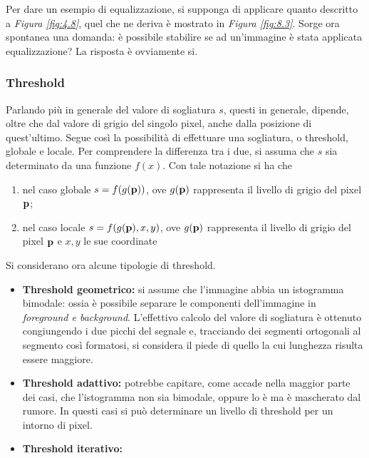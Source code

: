 \documentclass{subfiles}
\begin{document}
Per dare un esempio di equalizzazione, si supponga di applicare quanto descritto a \emph{Figura \ref{fig:4.8}}, quel che ne deriva è mostrato in \emph{Figura \ref{fig:8.3}}.
Sorge ora spontanea una domanda: è possibile stabilire se ad un'immagine è stata applicata equalizzazione? La risposta è ovviamente si.
\clearpage

\subsubsection{Threshold}
Parlando più in generale del valore di sogliatura \(s\), questi in generale, dipende, oltre che dal valore di grigio del singolo pixel, anche dalla posizione di quest'ultimo.
Segue così la possibilità di effettuare una sogliatura, o threshold, globale e locale.
Per comprendere la differenza tra i due, si assuma che \(s\) sia determinato da una funzione \(f(x)\).
Con tale notazione si ha che
\begin{enumerate}
    \item nel caso globale \(s = f(g(\vb{p}))\), ove \(g(\vb{p})\) rappresenta il livello di grigio del pixel \(\vb{p}\);
    \item nel caso locale \(s = f(g(\vb{p}), x, y)\), ove \(g(\vb{p})\) rappresenta il livello di grigio del pixel \(\vb{p}\) e \(x, y\) le sue coordinate
\end{enumerate}

Si considerano ora alcune tipologie di threshold.
\begin{itemize}
    \item \textbf{Threshold geometrico:} si assume che l'immagine abbia un istogramma bimodale:
          ossia è possibile separare le componenti dell'immagine in \emph{foreground \emph{e} background}.
          L'effettivo calcolo del valore di sogliatura è ottenuto congiungendo i due picchi del segnale e, tracciando dei segmenti ortogonali al segmento così formatosi,
          si considera il piede di quello la cui lunghezza risulta essere maggiore.

    \item \textbf{Threshold adattivo:} potrebbe capitare, come accade nella maggior parte dei casi, che l'istogramma non sia bimodale,
          oppure lo è ma è mascherato dal rumore. In questi casi si può determinare un livello di threshold per un intorno di pixel.

    \item \textbf{Threshold iterativo:} %
\end{itemize}
\end{document}
